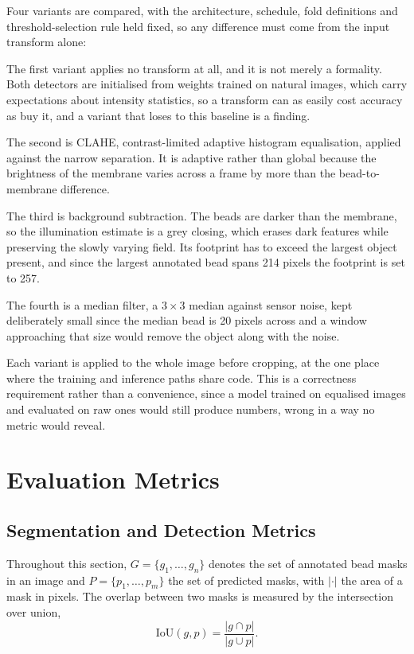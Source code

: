 Four variants are compared, with the architecture, schedule, fold definitions and
threshold-selection rule held fixed, so any difference must come from the
input transform alone:

The first variant applies no transform at all, and it is not merely a formality.
Both detectors are initialised from weights trained on natural images, which carry
expectations about intensity statistics, so a transform can as easily cost
accuracy as buy it, and a variant that loses to this baseline is a finding.

The second is CLAHE, contrast-limited adaptive histogram equalisation, applied
against the narrow separation. It is adaptive rather than global because the
brightness of the membrane varies across a frame by more than the
bead-to-membrane difference.

The third is background subtraction. The beads are darker than the membrane, so
the illumination estimate is a grey closing, which erases dark features while
preserving the slowly varying field. Its footprint has to exceed the largest
object present, and since the largest annotated bead spans 214 pixels the
footprint is set to 257.

The fourth is a median filter, a $3\times3$ median against sensor noise, kept
deliberately small since the median bead is 20 pixels across and a window
approaching that size would remove the object along with the noise.

Each variant is applied to the whole image before cropping, at the one
place where the training and inference paths share code. This is a correctness
requirement rather than a convenience, since a model trained on equalised images
and evaluated on raw ones would still produce numbers, wrong in a way no metric
would reveal.

\section{Evaluation Metrics}

\subsection{Segmentation and Detection Metrics}

Throughout this section, $G = \{g_1, \dots, g_n\}$ denotes the set of annotated bead
masks in an image and $P = \{p_1, \dots, p_m\}$ the set of predicted masks, with
$|\cdot|$ the area of a mask in pixels. The overlap between two masks is measured by
the intersection over union,
%
\begin{equation}
    \mathrm{IoU}(g, p) = \frac{|g \cap p|}{|g \cup p|}.
    \label{eq:iou}
\end{equation}

